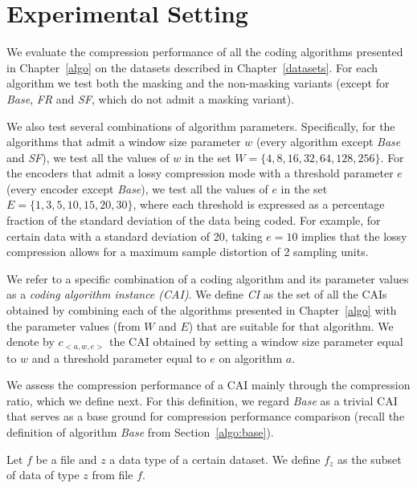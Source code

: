
\section{Experimental Setting}
\label{experiments:experiments}


We evaluate the compression performance of all the coding algorithms presented in Chapter~\ref{algo} on the datasets described in Chapter~\ref{datasets}. For each algorithm we test both the masking and the non-masking variants (except for \textit{Base}, \textit{FR} and \textit{SF}, which do not admit a masking variant).


We also test several combinations of algorithm parameters. Specifically, for the algorithms that admit a window size parameter $w$ (every algorithm except \textit{Base} and \textit{SF}), we test all the values of $w$ in the set $W = \{4, 8, 16, 32, 64, 128, 256\}$. For the encoders that admit a lossy compression mode with a threshold parameter $e$ (every encoder except \textit{Base}), we test all the values of $e$ in the set $E= \{1, 3, 5, 10, 15, 20, 30\}$, where each threshold is expressed as a percentage fraction of the standard deviation of the data being coded. For example, for certain data with a standard deviation of 20, taking $e=10$ implies that the lossy compression allows for a maximum sample distortion of 2 sampling units.


\vspace{+5pt}
\begin{defcion}
We refer to a specific combination of a coding algorithm and its parameter values as a \textit{coding algorithm instance (CAI)}. We define \textit{CI} as the set of all the CAIs obtained by combining each of the algorithms presented in Chapter~\ref{algo} with the parameter values (from $W$ and $E$) that are suitable for that algorithm. We denote by $c_{<a, w, e>}$ the CAI obtained by setting a window size parameter equal to $w$ and a threshold parameter equal to $e$ on algorithm $a$.
\end{defcion}


\clearpage


We assess the compression performance of a CAI mainly through the compression ratio, which we define next. For this definition, we regard \textit{Base} as a trivial CAI that serves as a base ground for compression performance comparison (recall the definition of algorithm \textit{Base} from Section~\ref{algo:base}).


\vspace{+5pt}
\begin{defcion}
Let $f$ be a file and $z$ a data type of a certain dataset. We define $f_z$ as the subset of data of type $z$ from file $f$.
\end{defcion}


